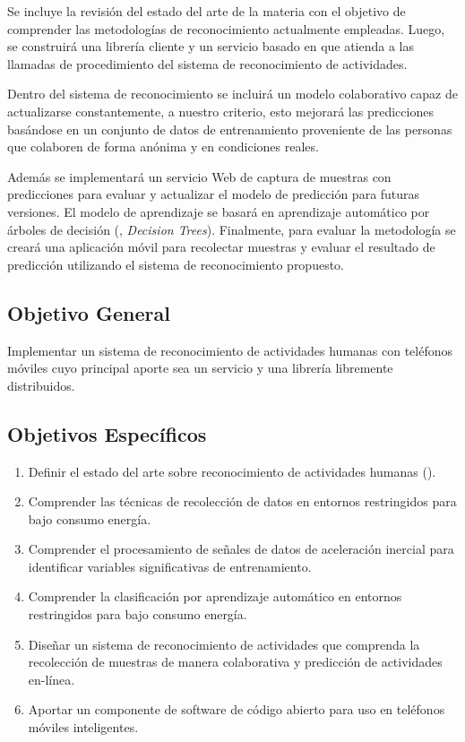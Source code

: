 Se incluye la revisión del estado del arte de la materia con el objetivo
de comprender las metodologías de reconocimiento actualmente empleadas.
Luego, se construirá una librería cliente y un servicio basado en
\emph{} que atienda a las llamadas de procedimiento
del sistema de reconocimiento de actividades. 

Dentro del sistema de reconocimiento se incluirá un modelo colaborativo
capaz de actualizarse constantemente, a nuestro criterio, esto mejorará
las predicciones basándose en un conjunto de datos de entrenamiento
proveniente de las personas que colaboren de forma anónima y en condiciones
reales.

Además se implementará un servicio Web de captura de muestras con
predicciones para evaluar y actualizar el modelo de predicción para
futuras versiones. El modelo de aprendizaje se basará en aprendizaje
automático por árboles de decisión (, \emph{Decision Trees}).
Finalmente, para evaluar la metodología se creará una aplicación móvil
para recolectar muestras y evaluar el resultado de predicción utilizando
el sistema de reconocimiento propuesto.

\subsection{Objetivo General}

\label{objetivo-general}

Implementar un sistema de reconocimiento de actividades humanas con
teléfonos móviles cuyo principal aporte sea un servicio y una librería
libremente distribuidos.

\subsection{Objetivos Específicos}

\label{objetivos-especuxedficos}
\begin{enumerate}
\item \label{enu:obe1}Definir el estado del arte sobre reconocimiento de
actividades humanas (). 
\item \label{enu:obe2}Comprender las técnicas de recolección de datos en
entornos restringidos para bajo consumo energía. 
\item \label{enu:obe3}Comprender el procesamiento de señales de datos de
aceleración inercial para identificar variables significativas de
entrenamiento. 
\item \label{enu:obe4}Comprender la clasificación por aprendizaje automático
en entornos restringidos para bajo consumo energía. 
\item \label{enu:obe5}Diseñar un sistema de reconocimiento de actividades
que comprenda la recolección de muestras de manera colaborativa y
predicción de actividades en-línea. 
\item \label{enu:obe6}Aportar un componente de software de código abierto
para uso en teléfonos móviles inteligentes. 
\end{enumerate}

